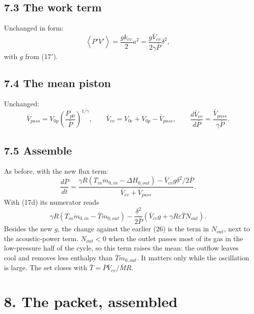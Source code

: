 \documentclass[11pt]{article}
\begin{document}
\subsection*{7.3 The work term}

Unchanged in form:
\begin{equation}
\left\langle P'\dot V'\right\rangle = \frac{gk_{cv}}{2}a^2 = \frac{g\bar V_{cv}}{2\gamma\bar P}\delta^2 , \tag{24}
\end{equation}
with $g$ from (17$'$).

\subsection*{7.4 The mean piston}

Unchanged:
\begin{equation}
\bar V_{pass} = V_{0p}\left(\frac{P_{p0}}{\bar P}\right)^{1/\gamma}, \qquad \bar V_{cv} = V_{0c} + V_{0p} - \bar V_{pass}, \qquad \frac{d\bar V_{cv}}{d\bar P} = \frac{\bar V_{pass}}{\gamma\bar P} . \tag{25}
\end{equation}

\subsection*{7.5 Assemble}

As before, with the new flux term:
\begin{equation}
\frac{d\bar P}{dt} = \frac{\gamma R\left(T_{in}\dot m_{0,in} - \Delta H_{0,out}\right) - \bar V_{cv}g\delta^2/2\bar P}{\bar V_{cv} + \bar V_{pass}} . \tag{26$'$}
\end{equation}
With (17d) its numerator reads
\[
\gamma R\left(T_{in}\dot m_{0,in} - \bar T\dot m_{0,out}\right) - \frac{\delta^2}{2\bar P}\left(\bar V_{cv}g + \gamma R\varepsilon\bar TN_{out}\right) .
\]
Besides the new $g$, the change against the earlier (26) is the term in $N_{out}$, next to the acoustic-power term. $N_{out} < 0$ when the outlet passes most of its gas in the low-pressure half of the cycle, so this term raises the mean: the outflow leaves cool and removes less enthalpy than $\bar T\dot m_{0,out}$. It matters only while the oscillation is large. The set closes with $\bar T = \bar P\bar V_{cv}/\bar MR$.

\section*{8. The packet, assembled}
\end{document}
